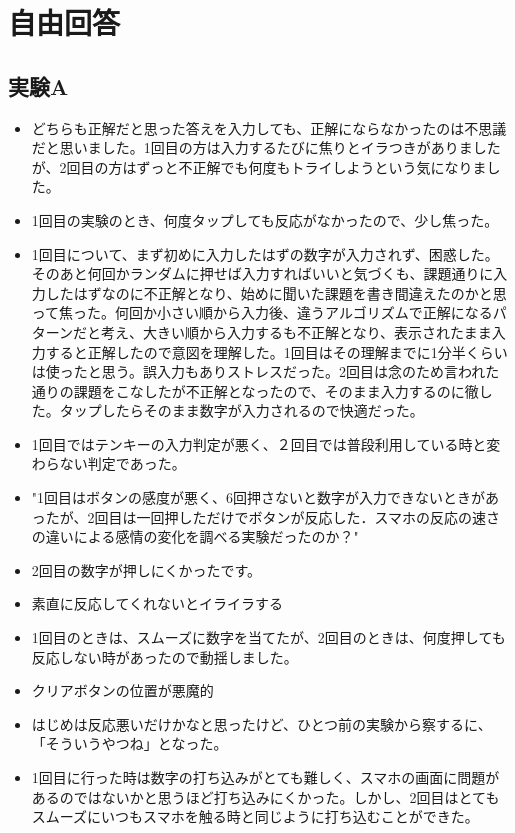 \chapter{自由回答}

\section{実験A}

\begin{itemize}
  \item どちらも正解だと思った答えを入力しても、正解にならなかったのは不思議だと思いました。1回目の方は入力するたびに焦りとイラつきがありましたが、2回目の方はずっと不正解でも何度もトライしようという気になりました。
  \item 1回目の実験のとき、何度タップしても反応がなかったので、少し焦った。
  \item 1回目について、まず初めに入力したはずの数字が入力されず、困惑した。そのあと何回かランダムに押せば入力すればいいと気づくも、課題通りに入力したはずなのに不正解となり、始めに聞いた課題を書き間違えたのかと思って焦った。何回か小さい順から入力後、違うアルゴリズムで正解になるパターンだと考え、大きい順から入力するも不正解となり、表示されたまま入力すると正解したので意図を理解した。1回目はその理解までに1分半くらいは使ったと思う。誤入力もありストレスだった。2回目は念のため言われた通りの課題をこなしたが不正解となったので、そのまま入力するのに徹した。タップしたらそのまま数字が入力されるので快適だった。
  \item 1回目ではテンキーの入力判定が悪く、２回目では普段利用している時と変わらない判定であった。
  \item "1回目はボタンの感度が悪く、6回押さないと数字が入力できないときがあったが、2回目は一回押しただけでボタンが反応した．スマホの反応の速さの違いによる感情の変化を調べる実験だったのか？"
  \item 2回目の数字が押しにくかったです。
  \item 素直に反応してくれないとイライラする
  \item 1回目のときは、スムーズに数字を当てたが、2回目のときは、何度押しても反応しない時があったので動揺しました。
  \item クリアボタンの位置が悪魔的
  \item はじめは反応悪いだけかなと思ったけど、ひとつ前の実験から察するに、「そういうやつね」となった。
  \item 1回目に行った時は数字の打ち込みがとても難しく、スマホの画面に問題があるのではないかと思うほど打ち込みにくかった。しかし、2回目はとてもスムーズにいつもスマホを触る時と同じように打ち込むことができた。

\end{itemize}
